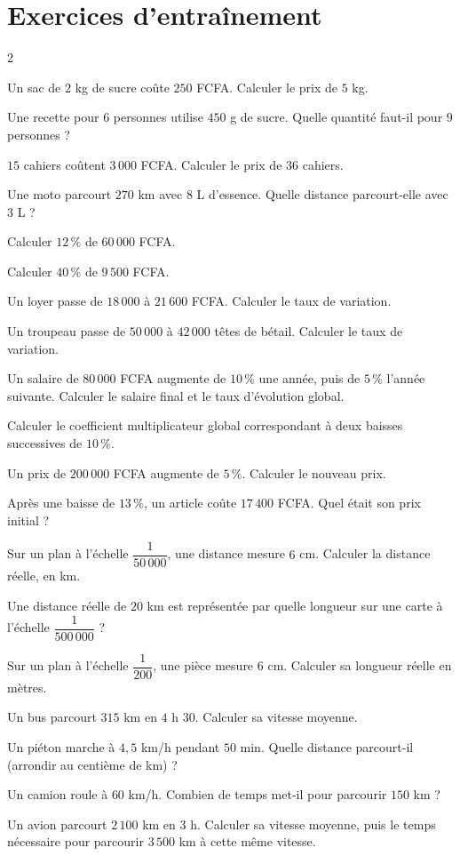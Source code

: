 \section{Exercices d'entraînement}
\begin{multicols}{2}

\exo{} Un sac de $2$ kg de sucre coûte $250$ FCFA. Calculer le prix de $5$ kg.

\exo{} Une recette pour $6$ personnes utilise $450$ g de sucre. Quelle quantité
faut-il pour $9$ personnes ?

\exo{} $15$ cahiers coûtent $3\,000$ FCFA. Calculer le prix de $36$ cahiers.

\exo{} Une moto parcourt $270$ km avec $8$ L d'essence. Quelle distance
parcourt-elle avec $3$ L ?

\exo{} Calculer $12\,\%$ de $60\,000$ FCFA.

\exo{} Calculer $40\,\%$ de $9\,500$ FCFA.

\exo{} Un loyer passe de $18\,000$ à $21\,600$ FCFA. Calculer le taux de variation.

\exo{} Un troupeau passe de $50\,000$ à $42\,000$ têtes de bétail. Calculer le
taux de variation.

\exo{} Un salaire de $80\,000$ FCFA augmente de $10\,\%$ une année, puis de
$5\,\%$ l'année suivante. Calculer le salaire final et le taux d'évolution global.

\exo{} Calculer le coefficient multiplicateur global correspondant à deux baisses
successives de $10\,\%$.

\exo{} Un prix de $200\,000$ FCFA augmente de $5\,\%$. Calculer le nouveau prix.

\exo{} Après une baisse de $13\,\%$, un article coûte $17\,400$ FCFA. Quel était
son prix initial ?

\exo{} Sur un plan à l'échelle $\dfrac1{50\,000}$, une distance mesure $6$ cm.
Calculer la distance réelle, en km.

\exo{} Une distance réelle de $20$ km est représentée par quelle longueur sur une
carte à l'échelle $\dfrac1{500\,000}$ ?

\exo{} Sur un plan à l'échelle $\dfrac1{200}$, une pièce mesure $6$ cm. Calculer sa
longueur réelle en mètres.

\exo{} Un bus parcourt $315$ km en $4$ h $30$. Calculer sa vitesse moyenne.

\exo{} Un piéton marche à $4{,}5$ km/h pendant $50$ min. Quelle distance
parcourt-il (arrondir au centième de km) ?

\exo{} Un camion roule à $60$ km/h. Combien de temps met-il pour parcourir $150$
km ?

\exo{} Un avion parcourt $2\,100$ km en $3$ h. Calculer sa vitesse moyenne, puis le
temps nécessaire pour parcourir $3\,500$ km à cette même vitesse.

\end{multicols}

